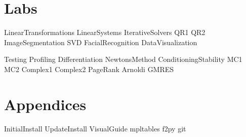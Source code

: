 \documentclass[nociteref]{SIAM-GH-book}
\begin{document}
\part{Labs} %
{LinearTransformations}
{LinearSystems}
{IterativeSolvers}
{QR1}
{QR2}
{ImageSegmentation}
{SVD}
{FacialRecognition}
{DataVisualization}

{Testing}
{Profiling}
{Differentiation}
{NewtonsMethod} %
{ConditioningStability}
{MC1}
{MC2}
{Complex1}
{Complex2}
{PageRank}
{Arnoldi}
{GMRES}


\part{Appendices} %
\begin{appendices}
{InitialInstall}
{UpdateInstall}
{VisualGuide}
{mpltables}
{f2py}
{git}
\end{appendices}
\end{document}
